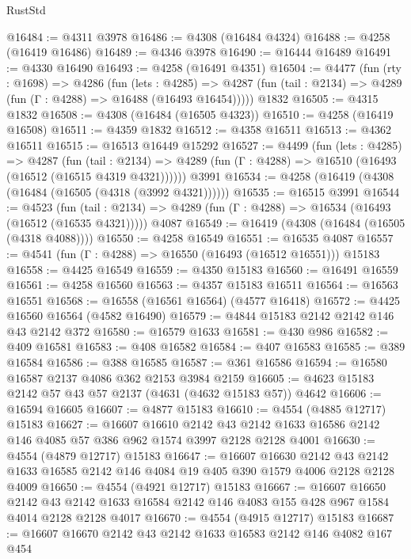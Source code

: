 \begin{lexlean}{RustStd}
\begin{coremodule}
@16484 := @4311 @3978
@16486 := @4308 (@16484 @4324)
@16488 := @4258 (@16419 @16486)
@16489 := @4346 @3978
@16490 := @16444 @16489
@16491 := @4330 @16490
@16493 := @4258 (@16491 @4351)
@16504 := @4477
    (fun (rty : @1698) =>
    @4286
      (fun (lets : @4285) =>
      @4287 (fun (tail : @2134) => @4289 (fun (Γ : @4288) => @16488 (@16493 @16454)))))
    @1832
@16505 := @4315 @1832
@16508 := @4308 (@16484 (@16505 @4323))
@16510 := @4258 (@16419 @16508)
@16511 := @4359 @1832
@16512 := @4358 @16511
@16513 := @4362 @16511
@16515 := @16513 @16449 @15292
@16527 := @4499
    (fun (lets : @4285) =>
    @4287
      (fun (tail : @2134) =>
      @4289 (fun (Γ : @4288) => @16510 (@16493 (@16512 (@16515 @4319 @4321))))))
    @3991
@16534 := @4258 (@16419 (@4308 (@16484 (@16505 (@4318 (@3992 @4321))))))
@16535 := @16515 @3991
@16544 := @4523
    (fun (tail : @2134) => @4289 (fun (Γ : @4288) => @16534 (@16493 (@16512 (@16535 @4321)))))
    @4087
@16549 := @16419 (@4308 (@16484 (@16505 (@4318 @4088))))
@16550 := @4258 @16549
@16551 := @16535 @4087
@16557 := @4541 (fun (Γ : @4288) => @16550 (@16493 (@16512 @16551))) @15183
@16558 := @4425 @16549
@16559 := @4350 @15183
@16560 := @16491 @16559
@16561 := @4258 @16560
@16563 := @4357 @15183 @16511
@16564 := @16563 @16551
@16568 := @16558 (@16561 @16564) (@4577 @16418)
@16572 := @4425 @16560 @16564 (@4582 @16490)
@16579 := @4844 @15183 @2142 @2142 @146 @43 @2142 @372
@16580 := @16579 @1633
@16581 := @430 @986
@16582 := @409 @16581
@16583 := @408 @16582
@16584 := @407 @16583
@16585 := @389 @16584
@16586 := @388 @16585
@16587 := @361 @16586
@16594 := @16580 @16587 @2137 @4086 @362 @2153 @3984 @2159
@16605 := @4623 @15183 @2142 @57 @43 @57 @2137 (@4631 (@4632 @15183 @57)) @4642
@16606 := @16594 @16605
@16607 := @4877 @15183
@16610 := @4554 (@4885 @12717) @15183
@16627 := @16607
    @16610
    @2142
    @43
    @2142
    @1633
    @16586
    @2142
    @146
    @4085
    @57
    @386
    @962
    @1574
    @3997
    @2128
    @2128
    @4001
@16630 := @4554 (@4879 @12717) @15183
@16647 := @16607
    @16630
    @2142
    @43
    @2142
    @1633
    @16585
    @2142
    @146
    @4084
    @19
    @405
    @390
    @1579
    @4006
    @2128
    @2128
    @4009
@16650 := @4554 (@4921 @12717) @15183
@16667 := @16607
    @16650
    @2142
    @43
    @2142
    @1633
    @16584
    @2142
    @146
    @4083
    @155
    @428
    @967
    @1584
    @4014
    @2128
    @2128
    @4017
@16670 := @4554 (@4915 @12717) @15183
@16687 := @16607
    @16670
    @2142
    @43
    @2142
    @1633
    @16583
    @2142
    @146
    @4082
    @167
    @454

\end{coremodule}
\end{lexlean}
